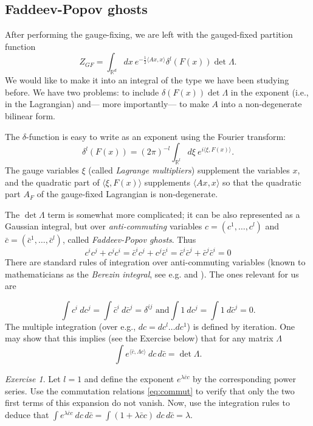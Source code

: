 \documentclass[10pt]{amsart}
\theoremstyle{definition}
\theoremstyle{remark}
\newtheorem{exs}[thm]{Exercise}
\newcommand{\R}{\mathbb R}
\def\<{\langle}
\def\>{\rangle}
\newcommand{\Gd}{\delta}
\newcommand{\Gl}{\lambda}
\newcommand{\GL}{\Lambda}
\begin{document}
\subsection{Faddeev-Popov ghosts}
After performing the gauge-fixing, we are left with the gauged-fixed
partition function
$$
        Z_{GF}=\int_{\R^d}dx\ e^{-\frac12\<Ax,x\>}\Gd^l(F(x))\det \GL .
$$
We would like to make it into an integral of the type we have been
studying before. We have two problems: to include
$\Gd(F(x))\det \GL$ in the exponent (i.e., in the Lagrangian)
and--- more importantly--- to make $A$ into a non-degenerate bilinear
form.

The $\Gd$-function is easy to write as an exponent using the
Fourier transform:
$$
     \Gd^l(F(x))=(2\pi)^{-l}\int_{\R^l}d\xi\ e^{i\<\xi,F(x)\>}.
$$
The gauge variables $\xi$ (called {\em Lagrange multipliers})
supplement the variables $x$, and the quadratic part of $\<\xi,F(x)\>$
supplements $\<Ax,x\>$ so that the quadratic part $A_F$ of the
gauge-fixed Lagrangian is non-degenerate.

The $\det\GL$ term is somewhat more complicated; it can be also
represented as a Gaussian integral, but over {\em anti-commuting}
variables $c=(c^1,\dots,c^l)$ and  $\bar{c}=(\bar{c}^1,\dots,\bar{c}^l)$,
called  {\em Faddeev-Popov ghosts}.
Thus
\begin{equation}\label{eq:commut}
c^ic^j+c^jc^i=\bar{c}^ic^j+c^j\bar{c}^i=\bar{c}^i\bar{c}^j
+\bar{c}^j\bar{c}^i=0
\end{equation}
There are standard rules of integration over anti-commuting
variables (known to mathematicians as the {\em Berezin integral}\/,
see e.g. \cite[Chapter 33]{Sc} and \cite{FS,IZ}).
The ones relevant for us are

$$\mbox{
$\int c^i\ dc^j=\int \bar{c}^i\ d\bar{c}^j=\Gd^{ij}$ and
$\int 1\ dc^j=\int 1\ d\bar{c}^j=0$.
}$$
The multiple integration (over e.g., $dc=dc^l\dots dc^1$)  is
defined by iteration. One may show that this implies (see the
Exercise below) that for any matrix $\GL$
$$
  \int e^{\<\bar{c},\GL c\>}\ dc\, d\bar{c}=\det \GL .
$$

\begin{exs}
Let $l=1$ and define the exponent $e^{\Gl\bar{c}c}$ by the
corresponding power series. Use the commutation relations
\eqref{eq:commut} to verify that only the two first terms of
this expansion do not vanish. Now, use the integration rules
to deduce that $\int e^{\Gl\bar{c}c}\ dc\, d\bar{c}=
\int(1+\Gl\bar{c}c)\ dc\, d\bar{c}=\Gl$.
\end{exs}
\end{document}
